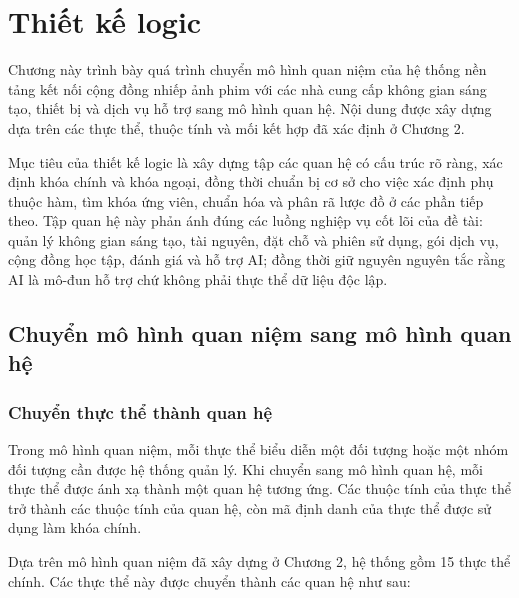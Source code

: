 \chapter{Thiết kế logic}

Chương này trình bày quá trình chuyển mô hình quan niệm của hệ thống nền tảng kết nối cộng đồng nhiếp ảnh phim với các nhà cung cấp không gian sáng tạo, thiết bị và dịch vụ hỗ trợ sang mô hình quan hệ. Nội dung được xây dựng dựa trên các thực thể, thuộc tính và mối kết hợp đã xác định ở Chương 2.

Mục tiêu của thiết kế logic là xây dựng tập các quan hệ có cấu trúc rõ ràng, xác định khóa chính và khóa ngoại, đồng thời chuẩn bị cơ sở cho việc xác định phụ thuộc hàm, tìm khóa ứng viên, chuẩn hóa và phân rã lược đồ ở các phần tiếp theo. Tập quan hệ này phản ánh đúng các luồng nghiệp vụ cốt lõi của đề tài: quản lý không gian sáng tạo, tài nguyên, đặt chỗ và phiên sử dụng, gói dịch vụ, cộng đồng học tập, đánh giá và hỗ trợ AI; đồng thời giữ nguyên nguyên tắc rằng AI là mô-đun hỗ trợ chứ không phải thực thể dữ liệu độc lập.

\section{Chuyển mô hình quan niệm sang mô hình quan hệ}

\subsection{Chuyển thực thể thành quan hệ}

Trong mô hình quan niệm, mỗi thực thể biểu diễn một đối tượng hoặc một nhóm đối tượng cần được hệ thống quản lý. Khi chuyển sang mô hình quan hệ, mỗi thực thể được ánh xạ thành một quan hệ tương ứng. Các thuộc tính của thực thể trở thành các thuộc tính của quan hệ, còn mã định danh của thực thể được sử dụng làm khóa chính.

Dựa trên mô hình quan niệm đã xây dựng ở Chương 2, hệ thống gồm 15 thực thể chính. Các thực thể này được chuyển thành các quan hệ như sau:

